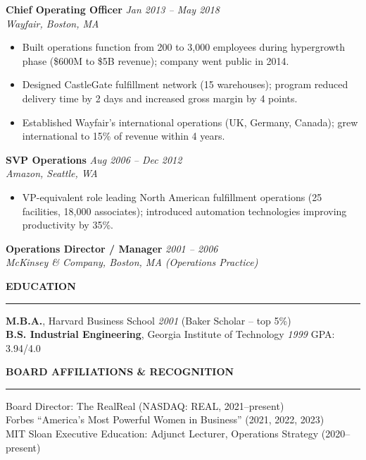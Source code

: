 \documentclass[11pt,a4paper]{article}
\begin{document}
\vspace{6pt}
\noindent\textbf{Chief Operating Officer} \hfill \textit{Jan 2013 -- May 2018}\\
\textit{Wayfair, Boston, MA}
\begin{itemize}
  \item Built operations function from 200 to 3,000 employees during hypergrowth phase (\$600M to \$5B revenue); company went public in 2014.
  \item Designed CastleGate fulfillment network (15 warehouses); program reduced delivery time by 2 days and increased gross margin by 4 points.
  \item Established Wayfair's international operations (UK, Germany, Canada); grew international to 15\% of revenue within 4 years.
\end{itemize}

\vspace{6pt}
\noindent\textbf{SVP Operations} \hfill \textit{Aug 2006 -- Dec 2012}\\
\textit{Amazon, Seattle, WA}
\begin{itemize}
  \item VP-equivalent role leading North American fulfillment operations (25 facilities, 18,000 associates); introduced automation technologies improving productivity by 35\%.
\end{itemize}

\vspace{6pt}
\noindent\textbf{Operations Director / Manager} \hfill \textit{2001 -- 2006}\\
\textit{McKinsey \& Company, Boston, MA (Operations Practice)}

\vspace{8pt}
\noindent\textbf{EDUCATION}\\
\noindent\rule{\textwidth}{0.4pt}

\noindent\textbf{M.B.A.}, Harvard Business School \hfill \textit{2001} \quad (Baker Scholar -- top 5\%)\\
\noindent\textbf{B.S. Industrial Engineering}, Georgia Institute of Technology \hfill \textit{1999} \quad GPA: 3.94/4.0

\vspace{6pt}
\noindent\textbf{BOARD AFFILIATIONS \& RECOGNITION}\\
\noindent\rule{\textwidth}{0.4pt}

\noindent Board Director: The RealReal (NASDAQ: REAL, 2021--present)\\
Forbes ``America's Most Powerful Women in Business'' (2021, 2022, 2023)\\
MIT Sloan Executive Education: Adjunct Lecturer, Operations Strategy (2020--present)
\end{document}
